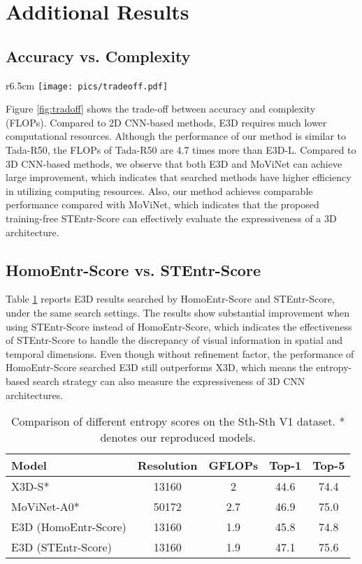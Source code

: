 \documentclass{article} \usepackage{iclr2023_conference,times}
\begin{document}
\section{Additional Results}
\label{sec:more results}

\subsection{Accuracy vs. Complexity}
\begin{wrapfigure}{r}{6.5cm}
    \centering
\texttt{[image: pics/tradeoff.pdf]}
    \caption{Accuracy/complexity trade-off on the Sth-Sth V2 dataset.}
    \label{fig:tradoff}
\end{wrapfigure}
Figure \ref{fig:tradoff} shows the trade-off between accuracy and complexity (FLOPs). 
Compared to 2D CNN-based methods, E3D requires much lower computational resources. 
Although the performance of our method is similar to Tada-R50, the FLOPs of Tada-R50 are 4.7 times more than E3D-L.
Compared to 3D CNN-based methods, we observe that both E3D and MoViNet can achieve large improvement, which indicates that searched methods have higher efficiency in utilizing computing resources. Also, our method achieves comparable performance compared with MoViNet, which indicates that the proposed training-free STEntr-Score can effectively evaluate the expressiveness of a 3D architecture.



\subsection{HomoEntr-Score vs. STEntr-Score}
Table \ref{tab:hescore vs stescore} reports E3D results searched by HomoEntr-Score and STEntr-Score, under the same search settings.
The results show substantial improvement when using STEntr-Score instead of HomoEntr-Score, which indicates the effectiveness of STEntr-Score to handle the discrepancy of visual information in spatial and temporal dimensions.
Even though without refinement factor, the performance of HomoEntr-Score searched E3D still outperforms X3D, which means the entropy-based search strategy can also 
measure the expressiveness of 3D CNN architectures.

\begin{table}[h]
    \centering
\begin{tabular}{lcccc}
    \toprule
       Model   & Resolution & GFLOPs & Top-1 & Top-5\\
    \midrule
      X3D-S* \citep{feichtenhofer2020x3d} & 13160 & 2 & 44.6 & 74.4\\
      MoViNet-A0* \citep{kondratyuk2021movinets} & 50172 & 2.7 &  46.9 & 75.0 \\
    \midrule
      E3D (HomoEntr-Score) & 13160 & 1.9 &  45.8 & 74.8\\
      E3D (STEntr-Score) & 13160 & 1.9 &  47.1 & 75.6\\
    \bottomrule
    \end{tabular}
    \caption{Comparison of different entropy scores on the Sth-Sth V1 dataset. * denotes our reproduced models.}
    \label{tab:hescore vs stescore}
\end{table}
\end{document}
